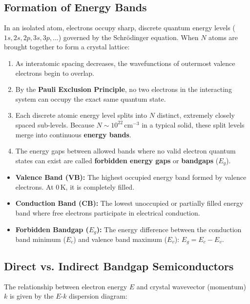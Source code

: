 \documentclass[12pt,a4paper]{article}
\begin{document}
\subsection{Formation of Energy Bands}
In an isolated atom, electrons occupy sharp, discrete quantum energy levels ($1s, 2s, 2p, 3s, 3p, \dots$) governed by the Schr\"{o}dinger equation. When $N$ atoms are brought together to form a crystal lattice:

\begin{enumerate}[label=\arabic*., leftmargin=*]
  \item As interatomic spacing decreases, the wavefunctions of outermost valence electrons begin to overlap.
  \item By the \textbf{Pauli Exclusion Principle}, no two electrons in the interacting system can occupy the exact same quantum state.
  \item Each discrete atomic energy level splits into $N$ distinct, extremely closely spaced sub-levels. Because $N \sim 10^{22}\,\text{cm}^{-3}$ in a typical solid, these split levels merge into continuous \textbf{energy bands}.
  \item The energy gaps between allowed bands where no valid electron quantum states can exist are called \textbf{forbidden energy gaps} or \textbf{bandgaps} ($E_g$).
\end{enumerate}

\begin{tcolorbox}[defbox, title={\textbf{Energy Band Definitions}}]
\begin{itemize}[leftmargin=*, itemsep=2pt, topsep=0pt]
  \item \textbf{Valence Band (VB):} The highest occupied energy band formed by valence electrons. At $0\,\text{K}$, it is completely filled.
  \item \textbf{Conduction Band (CB):} The lowest unoccupied or partially filled energy band where free electrons participate in electrical conduction.
  \item \textbf{Forbidden Bandgap ($E_g$):} The energy difference between the conduction band minimum ($E_c$) and valence band maximum ($E_v$): $E_g = E_c - E_v$.
\end{itemize}
\end{tcolorbox}

\subsection{Direct vs. Indirect Bandgap Semiconductors}
The relationship between electron energy $E$ and crystal wavevector (momentum) $k$ is given by the $E$-$k$ dispersion diagram:
\end{document}
